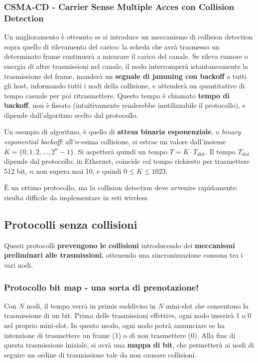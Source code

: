 \subsubsection{CSMA-CD - Carrier Sense Multiple Acces con Collision Detection}
Un miglioramento è ottenuto se si introduce un meccanismo di collision detection sopra quello di rilevamento del carico: la scheda che avrà trasmesso un determinato frame continuerà a misurare il carico del canale. Se rileva rumore o energia di altre trasmissioni nel canale, il nodo interromperà istantaneamente la trasmissione del frame, manderà un \textbf{segnale di jamming con backoff} a tutti gli host, informando tutti i nodi della collisione, e attenderà un quantitativo di tempo casuale per poi ritrasmettere. Questo tempo è chiamato \textbf{tempo di backoff}, non è fissato (intuitivamente renderebbe inutilizzabile il protocollo), e dipende dall'algoritmo scelto dal protocollo.

Un esempio di algoritmo, è quello di \textbf{attesa binaria esponenziale}, o \textit{binary exponential backoff}:
all'$n$-esima collisione, si estrae un valore dall'insieme $K=\{0,1,2,\dots,2^n-1\}$.
Si aspetterà quindi un tempo $T = K \cdot T_\text{slot}$. Il tempo $T_\text{slot}$ dipende dal protocollo: in Ethernet, coincide col tempo richiesto per trasmettere 512 bit, $n$ non supera mai 10, e quindi $0\leq K \leq1023$.

È un ottimo protocollo, ma la collision detection deve avvenire rapidamente: risulta difficile da implementare in reti wireless.

\subsection{Protocolli senza collisioni}
Questi protocolli \textbf{prevengono le collisioni} introducendo dei \textbf{meccanismi preliminari alle trasmissioni}, ottenendo una sincronizzazione consona tra i vari nodi.

\subsubsection{Protocollo bit map - una sorta di prenotazione!}
Con $N$ nodi, il tempo verrà in primis suddiviso in $N$ mini-slot che consentono la trasmissione di un bit. Prima delle trasmissioni effettive, ogni nodo inserirà 1 o 0 nel proprio mini-slot. In questo modo, ogni nodo potrà annunciare se ha intenzione di trasmettere un frame (1) o di non trasmettere (0).
Alla fine di questa trasmissione iniziale, si avrà una \textbf{mappa di bit}, che permetterà ai nodi di seguire un ordine di trasmissione tale da non causare collisioni.

